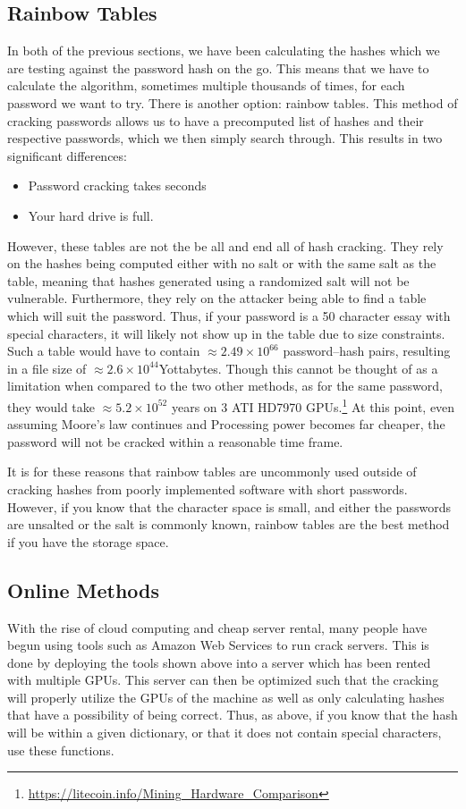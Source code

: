 		\subsection{Rainbow Tables}
			In both of the previous sections, we have been calculating the hashes which we are testing against the password hash on the go. 
			This means that we have to calculate the algorithm, sometimes multiple thousands of times, for each password we want to try. 
			There is another option: rainbow tables. 
			This method of cracking passwords allows us to have a precomputed list of hashes and their respective passwords, which we then simply search through. 
			This results in two significant differences:
			\begin{itemize}
				\item Password cracking takes seconds
				\item Your hard drive is full. 
			\end{itemize}
			However, these tables are not the be all and end all of hash cracking. 
			They rely on the hashes being computed either with no salt or with the same salt as the table, meaning that hashes generated using a randomized salt will not be vulnerable. 
			Furthermore, they rely on the attacker being able to find a table which will suit the password. 
			Thus, if your password is a 50 character essay with special characters, it will likely not show up in the table due to size constraints. 
			Such a table would have to contain $\approx2.49\times10^{66}$ password--hash pairs, resulting in a file size of $\approx2.6\times10^{44}$Yottabytes.
			Though this cannot be thought of as a limitation when compared to the two other methods, as for the same password, they would take $\approx5.2\times10^{52}$ years on 3 ATI HD7970 GPUs.\footnote{\url{https://litecoin.info/Mining\_Hardware\_Comparison}}
			At this point, even assuming Moore's law continues and Processing power becomes far cheaper, the password will not be cracked within a reasonable time frame. 

			It is for these reasons that rainbow tables are uncommonly used outside of cracking hashes from poorly implemented software with short passwords. 
			However, if you know that the character space is small, and either the passwords are unsalted or the salt is commonly known, rainbow tables are the best method if you have the storage space. 
		\subsection{Online Methods}
			With the rise of cloud computing and cheap server rental, many people have begun using tools such as Amazon Web Services to run crack servers. 
			This is done by deploying the tools shown above into a server which has been rented with multiple GPUs. 
			This server can then be optimized such that the cracking will properly utilize the GPUs of the machine as well as only calculating hashes that have a possibility of being correct. 
			Thus, as above, if you know that the hash will be within a given dictionary, or that it does not contain special characters, use these functions. 

